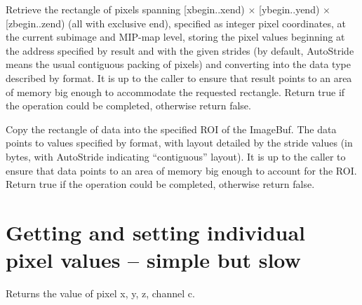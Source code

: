 Retrieve the rectangle of pixels spanning {\cf [xbegin..xend)} $\times$
{\cf [ybegin..yend)} $\times$ {\cf [zbegin..zend)} (all with exclusive
end), specified as integer pixel coordinates, at the current subimage and
MIP-map level, storing the pixel values beginning at the address
specified by {\cf result} and with the given strides (by default,
{\cf AutoStride} means the usual contiguous packing of pixels) and
converting into the data type described by {\cf format}.  It is
up to the caller to ensure that {\cf result} points to an area of
memory big enough to accommodate the requested rectangle.
Return {\cf true} if the operation could be completed, otherwise
return {\cf false}.
\apiend

Copy the rectangle of data into the specified ROI of the ImageBuf. The data
points to values specified by {\cf format}, with layout detailed by the
stride values (in bytes, with {\cf AutoStride} indicating ``contiguous''
layout). It is up to the caller to ensure that data points to an area of
memory big enough to account for the ROI. Return {\cf true} if the operation
could be completed, otherwise return {\cf false}.
\apiend



\section{Getting and setting individual pixel values -- simple but slow}

Returns the value of pixel {\cf x, y, z}, channel {\cf c}.  

